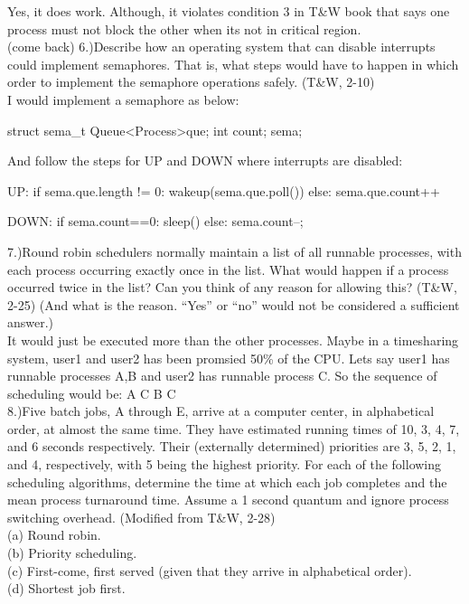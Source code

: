 \documentclass[11pt]{article}
\begin{document}
	Yes, it does work. Although, it violates condition 3 in T&W book that says one process 
must not block the other when its not in critical region. \\


(come back)
6.)Describe how an operating system that can disable interrupts could implement semaphores.	
That is, what steps would have to happen in which order to implement the semaphore operations safely. (T&W, 2-10) \\

	I would implement a semaphore as below:

	struct sema_t{
		Queue<Process>que;
		int count;
	}sema;

	And follow the steps for UP and DOWN where interrupts are disabled:

	UP:
		if sema.que.length != 0:
			wakeup(sema.que.poll())
		else:
			sema.que.count++

	DOWN:
		if sema.count==0:
			sleep()
		else:
			sema.count--;





7.)Round robin schedulers normally maintain a list of all runnable processes, with each process
occurring exactly once in the list. What would happen if a process occurred twice in the list?
Can you think of any reason for allowing this? (T&W, 2-25) (And what is the reason. “Yes”
or “no” would not be considered a sufficient answer.) \\

	It would just be executed more than the other processes. Maybe in a timesharing system, user1 and user2 has been promsied 50\% of the CPU.
Lets say user1 has runnable processes A,B and user2 has runnable process C. So the sequence of scheduling would be:
A C B C \\


8.)Five batch jobs, A through E, arrive at a computer center, in alphabetical order, at almost
the same time. They have estimated running times of 10, 3, 4, 7, and 6 seconds respectively.
Their (externally determined) priorities are 3, 5, 2, 1, and 4, respectively, with 5 being the
highest priority. For each of the following scheduling algorithms, determine the time at which
each job completes and the mean process turnaround time. Assume a 1 second quantum and
ignore process switching overhead. (Modified from T&W, 2-28) \\ 

(a) Round robin. \\
(b) Priority scheduling. \\ 
(c) First-come, first served (given that they arrive in alphabetical order). \\
(d) Shortest job first. \\
\end{document}
